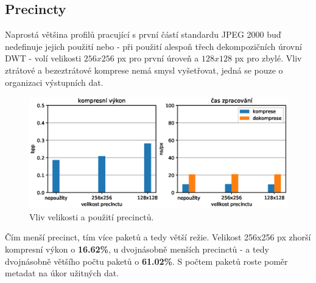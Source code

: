 \clearpage

%
%
\newpage
\subsection*{Precincty}
Naprostá většina profilů pracující s první částí standardu JPEG 2000 buď nedefinuje jejich použití nebo - při použití alespoň třech dekompozičních úrovní DWT - volí velikosti $256x256$ px pro první úroveň a $128x128$ px pro zbylé. Vliv ztrátové a bezeztrátové komprese nemá smysl vyšetřovat, jedná se pouze o organizaci výstupních dat.

\begin{figure}[hbt!]
  \centering
  \hspace*{-0.75cm}
  \includegraphics[width=16cm]{obrazky-figures/prec/fotky_prec.eps}
  \caption{Vliv velikosti a použití precinctů.}
\end{figure}

\noindent Čím menší precinct, tím více paketů a tedy větší režie. Velikost 256x256 px zhorší kompresní výkon o \textbf{16.62\%}, u dvojnásobně menších precinctů - a tedy dvojnásobně většího počtu paketů o \textbf{61.02\%}. S počtem paketů roste poměr metadat na úkor užitných dat.
\clearpage

%
%
